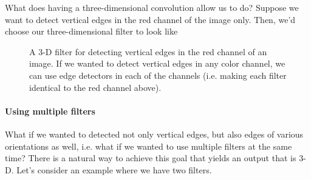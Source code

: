 \documentclass[12pt]{article}
\begin{document}
What does having a three-dimensional convolution allow us to do? Suppose we want to detect vertical edges in the red channel
of the image only. Then, we'd choose our three-dimensional filter to look like
\begin{figure}[h]
  \centering   {}
  \caption{\footnotesize A 3-D filter for detecting vertical edges in the red channel of an image. If we wanted to detect vertical
    edges in any color channel, we can use edge detectors in each of the channels (i.e. making each filter identical 
    to the red channel above).} \end{figure}

\paragraph{Using multiple filters} What if we wanted to detected not only vertical edges, but also edges of various orientations
as well, i.e. what if we wanted to use multiple filters at the same time? There is a natural way to achieve this goal that yields
an output that is 3-D. Let's consider an example where we have two filters.
\end{document}
